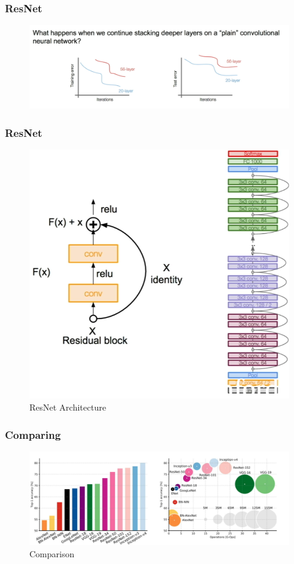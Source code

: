\documentclass{beamer}
\begin{document}
\begin{frame}
\frametitle{ResNet}

\begin{figure}
	\includegraphics[width=\linewidth]{Pics/plain.png}
\end{figure}

\end{frame}

\begin{frame}
\frametitle{ResNet}

\begin{figure}
	\includegraphics[width=.6\linewidth]{Pics/resnet.png}
	\caption{ResNet Architecture}
\end{figure}

\end{frame}
\begin{frame}
	
\frametitle{Comparing}

\begin{figure}
	\includegraphics[width=\linewidth]{Pics/ccomplex.png}
	\caption{Comparison}
\end{figure}

\end{frame}
\end{document}
